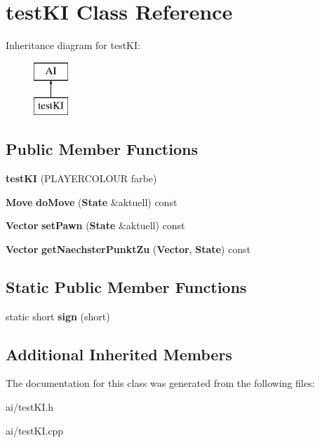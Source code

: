 \section{test\-K\-I Class Reference}
\label{classtest_k_i}
Inheritance diagram for test\-K\-I\-:\begin{figure}[H]
\begin{center}
\leavevmode
\includegraphics[height=2.000000cm]{classtest_k_i}
\end{center}
\end{figure}
\subsection*{Public Member Functions}
\begin{DoxyCompactItemize}
\item 
{\bfseries test\-K\-I} (P\-L\-A\-Y\-E\-R\-C\-O\-L\-O\-U\-R farbe)\label{classtest_k_i_a6a6166ca8fb468f949466a7f147c989f}

\item 
{\bf Move} {\bfseries do\-Move} ({\bf State} \&aktuell) const \label{classtest_k_i_ab58e500cbfcca1359e8d69f4ff748403}

\item 
{\bf Vector} {\bfseries set\-Pawn} ({\bf State} \&aktuell) const \label{classtest_k_i_ab2290352b41b2293ccbfa175d1d1cc5f}

\item 
{\bf Vector} {\bfseries get\-Naechster\-Punkt\-Zu} ({\bf Vector}, {\bf State}) const \label{classtest_k_i_ae5c4cfdc479bb706a9adb84d41dff707}

\end{DoxyCompactItemize}
\subsection*{Static Public Member Functions}
\begin{DoxyCompactItemize}
\item 
static short {\bfseries sign} (short)\label{classtest_k_i_a22f65151709965a8d75c82ebc34f3c14}

\end{DoxyCompactItemize}
\subsection*{Additional Inherited Members}


The documentation for this class was generated from the following files\-:\begin{DoxyCompactItemize}
\item 
ai/test\-K\-I.\-h\item 
ai/test\-K\-I.\-cpp\end{DoxyCompactItemize}
